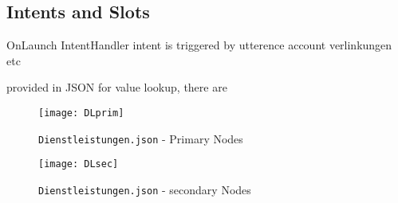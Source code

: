 \subsection{Intents and Slots} 

OnLaunch
IntentHandler
intent is triggered by utterence
account verlinkungen etc

%

provided in JSON for value lookup, there are

\begin{figure}[h!]
	\caption{\lstinline|Dienstleistungen.json|  - Primary Nodes}
	\texttt{[image: DLprim]}
\end{figure}

\begin{figure}[h]
	\caption{\lstinline|Dienstleistungen.json| - secondary Nodes}
	\texttt{[image: DLsec]}
\end{figure}

